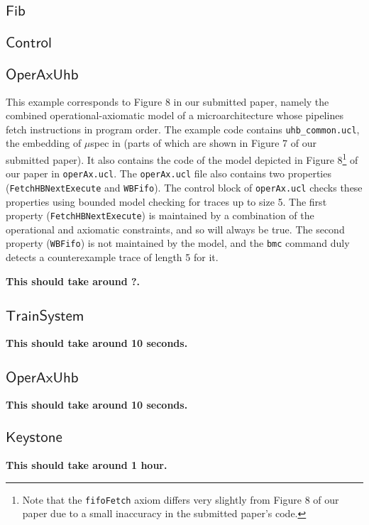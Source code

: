 \documentclass[runningheads]{llncs}
\begin{document}
\newcommand{\excommand}[1]{$\mathsf{#1}$}

\subsection{\excommand{Fib}}


\subsection{\excommand{Control}}

\subsection{\excommand{OperAxUhb}}

This example corresponds to Figure 8 in our submitted paper, namely the combined operational-axiomatic model of a microarchitecture whose pipelines fetch instructions in program order.
The example code contains \texttt{uhb\_common.ucl}, the embedding of $\mu$spec in \uclid (parts of which are shown in Figure 7 of our submitted paper).
It also contains the code of the model depicted in Figure 8\footnote{Note that the \texttt{fifoFetch} axiom differs very slightly from Figure 8 of our paper due to a small inaccuracy in the submitted paper's code.} of our paper in \texttt{operAx.ucl}.
The \texttt{operAx.ucl} file also contains two properties (\texttt{FetchHBNextExecute} and \texttt{WBFifo}). The control block of \texttt{operAx.ucl} checks these properties using bounded model checking for traces up to size 5.
The first property (\texttt{FetchHBNextExecute}) is maintained by a combination of the operational and axiomatic constraints, and so will always be true.
The second property (\texttt{WBFifo}) is not maintained by the model, and the \texttt{bmc} command duly detects a counterexample trace of length 5 for it.

\textbf{This should take around ?.}

\subsection{\excommand{TrainSystem}}


\textbf{This should take around 10 seconds.}

\subsection{\excommand{OperAxUhb}}


\textbf{This should take around 10 seconds.}

\subsection{\excommand{Keystone}}


\textbf{This should take around 1 hour.}
\end{document}

